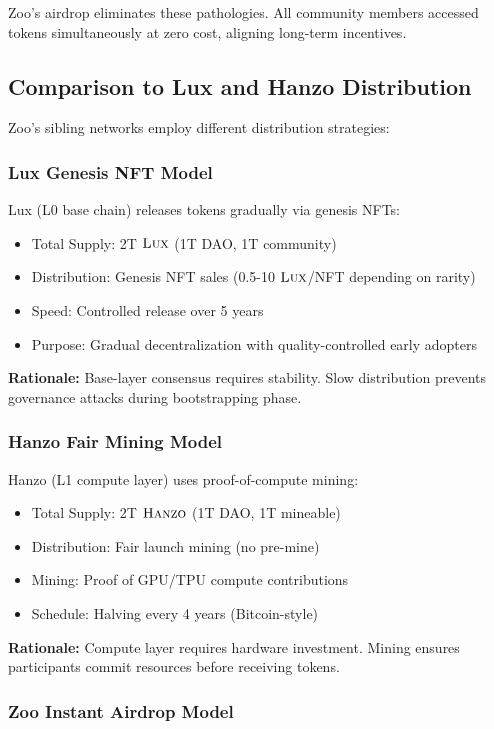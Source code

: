 \documentclass[11pt,letterpaper]{article}
\theoremstyle{definition}
\theoremstyle{remark}
\newcommand{\Hanzo}{\textsc{Hanzo}}
\newcommand{\Lux}{\textsc{Lux}}
\begin{document}
Zoo's airdrop eliminates these pathologies. All community members accessed tokens simultaneously at zero cost, aligning long-term incentives.

\subsection{Comparison to Lux and Hanzo Distribution}

Zoo's sibling networks employ different distribution strategies:

\subsubsection{Lux Genesis NFT Model}

Lux (L0 base chain) releases tokens gradually via genesis NFTs:
\begin{itemize}
\item Total Supply: 2T $\Lux$ (1T DAO, 1T community)
\item Distribution: Genesis NFT sales (0.5-10 $\Lux$/NFT depending on rarity)
\item Speed: Controlled release over 5 years
\item Purpose: Gradual decentralization with quality-controlled early adopters
\end{itemize}

\textbf{Rationale:} Base-layer consensus requires stability. Slow distribution prevents governance attacks during bootstrapping phase.

\subsubsection{Hanzo Fair Mining Model}

Hanzo (L1 compute layer) uses proof-of-compute mining:
\begin{itemize}
\item Total Supply: 2T $\Hanzo$ (1T DAO, 1T mineable)
\item Distribution: Fair launch mining (no pre-mine)
\item Mining: Proof of GPU/TPU compute contributions
\item Schedule: Halving every 4 years (Bitcoin-style)
\end{itemize}

\textbf{Rationale:} Compute layer requires hardware investment. Mining ensures participants commit resources before receiving tokens.

\subsubsection{Zoo Instant Airdrop Model}
\end{document}
